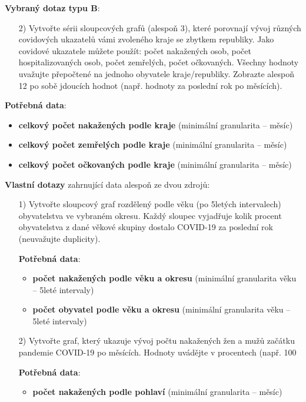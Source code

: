 \documentclass[12pt]{article}
\begin{document}
\hspace{1cm}

\textbf{Vybraný dotaz typu B}:
\begin{itemize}
    \item[2)] Vytvořte sérii sloupcových grafů (alespoň 3), které porovnají vývoj různých covidových ukazatelů vámi zvoleného kraje se zbytkem republiky. Jako covidové ukazatele můžete použít: počet nakažených osob, počet hospitalizovaných osob, počet zemřelých, počet očkovaných. Všechny hodnoty uvažujte přepočtené na jednoho obyvatele kraje/republiky. Zobrazte alespoň 12 po sobě jdoucích hodnot (např. hodnoty za poslední rok po měsících).
\end{itemize}

    \item[] \textbf{Potřebná data}:
    \begin{itemize}
        \item \textbf{celkový počet nakažených podle kraje} (minimální granularita -- měsíc)
        \item \textbf{celkový počet zemřelých podle kraje} (minimální granularita -- měsíc)
        \item \textbf{celkový počet očkovaných podle kraje} (minimální granularita -- měsíc)
    \end{itemize}

\hspace{1cm}

\textbf{Vlastní dotazy} zahrnující data alespoň ze dvou zdrojů:
\begin{itemize}
    \item[1)] Vytvořte sloupcový graf rozdělený podle věku (po 5letých intervalech) obyvatelstva ve vybraném okresu. Každý sloupec vyjadřuje kolik procent obyvatelstva z dané věkové skupiny dostalo COVID-19 za poslední rok (neuvažujte duplicity).

    \item[] \textbf{Potřebná data}:
    \begin{itemize}
        \item \textbf{počet nakažených podle věku a okresu} (minimální granularita věku -- 5leté intervaly)
        \item \textbf{počet obyvatel podle věku a okresu} (minimální granularita věku -- 5leté intervaly)
    \end{itemize}

    \item[2)] Vytvořte graf, který ukazuje vývoj počtu nakažených žen a mužů začátku pandemie COVID-19 po měsících. Hodnoty uvádějte v procentech (např. 100%

    \item[] \textbf{Potřebná data}:
    \begin{itemize}
        \item \textbf{počet nakažených podle pohlaví } (minimální granularita -- měsíc)
    \end{itemize}
\end{itemize}
\end{document}
